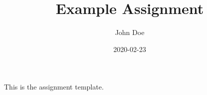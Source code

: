 \documentclass{assignment}
\title{Example Assignment}
\author{John Doe}
\date{2020-02-23}
\begin{document}
\maketitle
\noindent
This is the assignment template.
\end{document}
